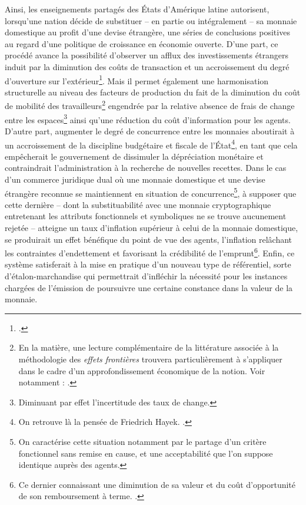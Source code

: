 {Ainsi, les enseignements partagés des États d'Amérique latine autorisent, lorsqu'une nation décide de substituer \---{} en partie ou intégralement \---{} sa monnaie domestique au profit d'une devise étrangère, une séries de conclusions positives au regard d'une politique de croissance en économie ouverte. D'une part, ce procédé avance la possibilité d'observer un afflux des investissements étrangers induit par la diminution des coûts de transaction et un accroissement du degré d'ouverture sur l'extérieur\footnote{.}. Mais il  permet également une harmonisation structurelle au niveau des facteurs de production du fait de la diminution du coût de mobilité des travailleurs\footnote{En la matière, une lecture complémentaire de la littérature associée à la méthodologie des \emph{effets frontières} trouvera particulièrement à s'appliquer dans le cadre d'un approfondissement économique de la notion. Voir notamment : .} engendrée par la relative absence de frais de change entre les espaces\footnote{Diminuant par effet l'incertitude des taux de change.} ainsi qu'une réduction du coût d'information pour les agents. D'autre part, augmenter le degré de concurrence entre les monnaies aboutirait à un accroissement de la discipline budgétaire et fiscale de l'État\footnote{On retrouve là la pensée de Friedrich Hayek. .}, en tant que cela empêcherait le gouvernement de dissimuler la dépréciation monétaire et contraindrait l'administration à la recherche de nouvelles recettes. Dans le cas d'un commerce juridique dual où une monnaie domestique et une devise étrangère reconnue se maintiennent en situation de concurrence\footnote{On caractérise cette situation notamment par le partage d'un critère fonctionnel sans remise en cause, et une acceptabilité que l'on suppose identique auprès des agents.}, à supposer que cette dernière \---{} dont la substituabilité avec une monnaie cryptographique entretenant les attributs fonctionnels et symboliques ne se trouve aucunement rejetée \---{} atteigne un taux d'inflation supérieur à celui de la monnaie domestique, se produirait un effet bénéfique du point de vue des agents, l'inflation relâchant les contraintes d'endettement et favorisant la crédibilité de l'emprunt\footnote{Ce dernier connaissant une diminution de sa valeur et du coût d'opportunité de son remboursement à terme. .}. Enfin, ce système satisferait à la mise en pratique d'un nouveau type de référentiel, sorte d'étalon-marchandise qui permettrait d'infléchir la nécessité pour les instances chargées de l'émission de poursuivre une certaine constance dans la valeur de la monnaie.\par

}
